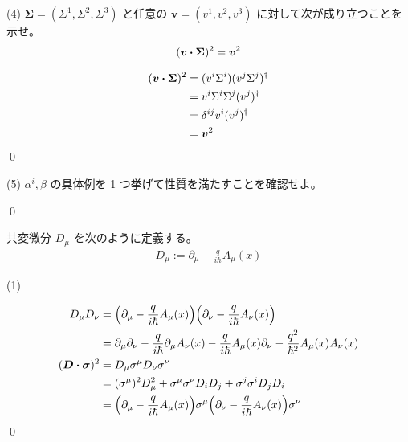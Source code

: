 \documentclass[uplatex,dvipdfmx,a4paper,11pt]{jlreq}
\makeatletter
\theoremstyle{definition}
\renewenvironment{proof}[1][\proofname]{\par
  \normalfont
  \topsep6\p@\@plus6\p@ \trivlist
  \item[\hskip\labelsep{\bfseries #1}\@addpunct{\bfseries}]\ignorespaces\quad\par
}{%
  \qed\endtrivlist\@endpefalse
}
\renewcommand\proofname{証明}
\makeatother
\begin{document}
(4) $\bm{\Sigma} = (\Sigma^1, \Sigma^2, \Sigma^3)$ と任意の $\bm{v} = (v^1, v^2, v^3)$ に対して次が成り立つことを示せ。
\begin{align}
  (\bm{v}\vdot\bm{\Sigma})^2 = \bm{v}^2
\end{align}
\begin{proof}
  \begin{align}
    (\bm{v}\vdot\bm{\Sigma})^2 & = (v^i\Sigma^i)(v^j\Sigma^j)^\dagger \\
                               & = v^i\Sigma^i\Sigma^j(v^j)^\dagger   \\
                               & = \delta^{ij}v^i(v^j)^\dagger        \\
                               & = \bm{v}^2
  \end{align}
\end{proof}

(5) $\alpha^i, \beta$ の具体例を 1 つ挙げて性質を満たすことを確認せよ。
\begin{proof}

\end{proof}

\begin{problem}
共変微分 $D_\mu$ を次のように定義する。
\begin{align}
  D_\mu := \partial_\mu - \frac{q}{i\hbar}A_\mu(x)
\end{align}
\end{problem}
(1)
\begin{proof}
  \begin{align}
    D_\mu D_\nu                & = \qty(\partial_\mu - \frac{q}{i\hbar}A_\mu(x))\qty(\partial_\nu - \frac{q}{i\hbar}A_\nu(x))                                                    \\
                               & = \partial_\mu\partial_\nu - \frac{q}{i\hbar}\partial_\mu A_\nu(x) - \frac{q}{i\hbar}A_\mu(x)\partial_\nu - \frac{q^2}{\hbar^2}A_\mu(x)A_\nu(x) \\
    (\bm{D}\vdot\bm{\sigma})^2 & = D_\mu\sigma^\mu D_\nu\sigma^\nu                                                                                                               \\
                               & = (\sigma^\mu)^2D_\mu^2 + \sigma^\mu\sigma^\nu D_iD_j + \sigma^j\sigma^iD_jD_i                                                                  \\
                               & = \qty(\partial_\mu - \frac{q}{i\hbar}A_\mu(x))\sigma^\mu\qty(\partial_\nu - \frac{q}{i\hbar}A_\nu(x))\sigma^\nu
  \end{align}
\end{proof}
\end{document}
